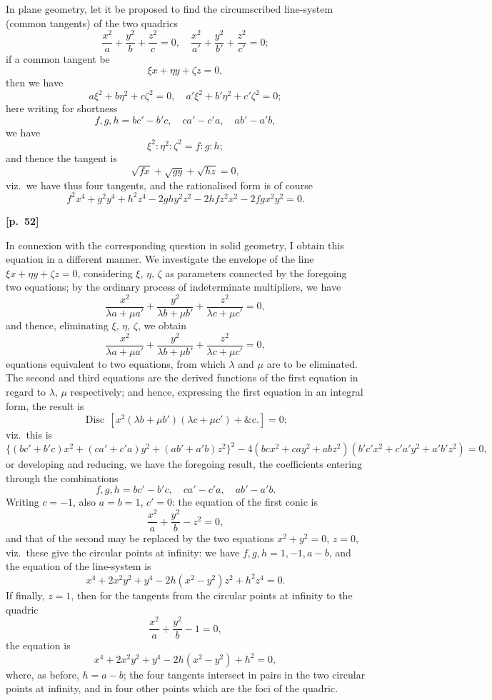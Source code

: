 \documentclass[11pt,a4paper]{book}
\providecommand{\Disc}{\mathop{\mathrm{Disc}}\nolimits}
\begin{document}
In plane geometry, let it be proposed to find the circumscribed line-system (common tangents) of the two quadrics
$$
\frac{x^2}{a} + \frac{y^2}{b} + \frac{z^2}{c} = 0, \quad \frac{x^2}{a'} + \frac{y^2}{b'} + \frac{z^2}{c'} = 0;
$$
if a common tangent be
$$
\xi x + \eta y + \zeta z = 0,
$$
then we have
$$
a\xi^2 + b\eta^2 + c\zeta^2 = 0, \quad a'\xi^2 + b'\eta^2 + c'\zeta^2 = 0;
$$
here writing for shortness
$$
f, g, h = bc' - b'c, \quad ca' - c'a, \quad ab' - a'b,
$$
we have
$$
\xi^2 : \eta^2 : \zeta^2 = f : g : h;
$$
and thence the tangent is
$$
\sqrt{fx} + \sqrt{gy} + \sqrt{hz} = 0,
$$
viz.\ we have thus four tangents, and the rationalised form is of course
$$
f^2 x^4 + g^2 y^4 + h^2 z^4 - 2ghy^2 z^2 - 2hfz^2 x^2 - 2fgx^2 y^2 = 0.
$$

\vspace{0.5em}
\noindent\textbf{[p.\ 52]}

In connexion with the corresponding question in solid geometry, I obtain this equation in a different manner. We investigate the envelope of the line $\xi x + \eta y + \zeta z = 0$, considering $\xi$, $\eta$, $\zeta$ as parameters connected by the foregoing two equations; by the ordinary process of indeterminate multipliers, we have
$$
\frac{x^2}{\lambda a + \mu a'} + \frac{y^2}{\lambda b + \mu b'} + \frac{z^2}{\lambda c + \mu c'} = 0,
$$
and thence, eliminating $\xi$, $\eta$, $\zeta$, we obtain
$$
\frac{x^2}{\lambda a + \mu a'} + \frac{y^2}{\lambda b + \mu b'} + \frac{z^2}{\lambda c + \mu c'} = 0,
$$
equations equivalent to two equations, from which $\lambda$ and $\mu$ are to be eliminated. The second and third equations are the derived functions of the first equation in regard to $\lambda$, $\mu$ respectively; and hence, expressing the first equation in an integral form, the result is
$$
\Disc\, [x^2(\lambda b + \mu b')(\lambda c + \mu c') + \text{\&c.}] = 0;
$$
viz.\ this is
$$
\{(bc' + b'c)x^2 + (ca' + c'a)y^2 + (ab' + a'b)z^2\}^2 - 4(bcx^2 + cay^2 + abz^2)(b'c'x^2 + c'a'y^2 + a'b'z^2) = 0,
$$
or developing and reducing, we have the foregoing result, the coefficients entering through the combinations
$$
f, g, h = bc' - b'c, \quad ca' - c'a, \quad ab' - a'b.
$$
Writing $c = -1$, also $a = b = 1$, $c' = 0$: the equation of the first conic is
$$
\frac{x^2}{a} + \frac{y^2}{b} - z^2 = 0,
$$
and that of the second may be replaced by the two equations $x^2 + y^2 = 0$, $z = 0$, viz.\ these give the circular points at infinity: we have $f, g, h = 1, -1, a - b$, and the equation of the line-system is
$$
x^4 + 2x^2 y^2 + y^4 - 2h(x^2 - y^2)z^2 + h^2 z^4 = 0.
$$
If finally, $z = 1$, then for the tangents from the circular points at infinity to the quadric
$$
\frac{x^2}{a} + \frac{y^2}{b} - 1 = 0,
$$
the equation is
$$
x^4 + 2x^2 y^2 + y^4 - 2h(x^2 - y^2) + h^2 = 0,
$$
where, as before, $h = a - b$; the four tangents intersect in pairs in the two circular points at infinity, and in four other points which are the foci of the quadric.
\end{document}
